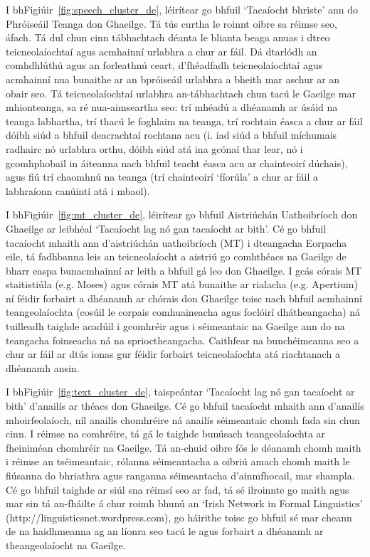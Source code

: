 \begin{multicols}{2}
%
I bhFigiúir~\ref{fig:speech_cluster_de}, léirítear go bhfuil `Tacaíocht bhriste’ ann do Phróiseáil Teanga don Ghaeilge. Tá tús curtha le roinnt oibre sa réimse seo, áfach. Tá dul chun cinn tábhachtach déanta le blianta beaga anuas i dtreo teicneolaíochtaí agus acmhainní urlabhra a chur ar fáil. Dá dtarlódh an comhdhlúthú agus an forleathnú ceart, d’fhéadfadh teicneolaíochtaí agus acmhainní nua bunaithe ar an bpróiseáil urlabhra a bheith mar aschur ar an obair seo. Tá teicneolaíochtaí urlabhra an-tábhachtach chun tacú le Gaeilge mar mhionteanga, sa ré nua-aimseartha seo: trí mhéadú a dhéanamh ar úsáid na teanga labhartha, trí thacú le foghlaim na teanga, trí rochtain éasca a chur ar fáil dóibh siúd a bhfuil deacrachtaí rochtana acu (i. iad siúd a bhfuil míchumais radhairc nó urlabhra orthu, dóibh siúd atá ina gcónaí thar lear, nó i gcomhphobail in áiteanna nach bhfuil teacht éasca acu ar chainteoirí dúchais), agus fiú trí chaomhnú na teanga (trí chainteoirí `fíorúla’ a chur ar fáil a labhraíonn canúintí atá i mbaol).

I bhFigiúir~\ref{fig:mt_cluster_de}, léirítear go bhfuil Aistriúchán Uathoibríoch don Ghaeilge ar leibhéal ‘Tacaíocht lag nó gan tacaíocht ar bith’. Cé go bhfuil tacaíocht mhaith ann d’aistriúchán uathoibríoch (MT) i dteangacha Eorpacha eile, tá fadhbanna leis an teicneolaíocht a aistriú go comhthéacs na Gaeilge de bharr easpa bunacmhainní ar leith a bhfuil gá leo don Ghaeilge. I gcás córais MT staitistiúla (e.g. Moses) agus córais MT atá bunaithe ar rialacha (e.g. Apertium) ní féidir forbairt a dhéanamh ar chórais don Ghaeilge toisc nach bhfuil acmhainní teangeolaíochta (cosúil le corpais comhuaineacha agus foclóirí dhátheangacha) ná tuilleadh taighde acadúil i gcomhréir agus i séimeantaic na Gaeilge ann do na teangacha foinseacha ná na sprioctheangacha. Caithfear na bunchéimeanna seo a chur ar fáil ar dtús ionas gur féidir forbairt teicneolaíochta atá riachtanach a dhéanamh ansin.

I bhFigiúir~\ref{fig:text_cluster_de}, taispeántar ‘Tacaíocht lag nó gan tacaíocht ar bith’ d’anailís ar théacs don Ghaeilge. Cé go bhfuil tacaíocht mhaith ann d’anailís mhoirfeolaíoch, níl anailís chomhréire ná anailís séimeantaic chomh fada sin chun cinn. I réimse na comhréire, tá gá le taighde bunúsach teangeolaíochta ar fheiniméan chomhréir na Gaeilge. Tá an-chuid oibre fós le déanamh chomh maith i réimse an tséimeantaic, rólanna séimeantacha a oibriú amach chomh maith le fiúsanna do bhriathra agus ranganna séimeantacha d’ainmfhocail, mar shampla. Cé go bhfuil taighde ar siúl sna réimsí seo ar fad, tá sé ilroinnte go maith agus mar sin tá an-fháilte á chur roimh bhunú an ‘Irish Network in Formal Linguistics' (http://linguisticsnet.wordpress.com), go háirithe toisc go bhfuil sé mar cheann de na haidhmeanna ag an líonra seo tacú le agus forbairt a dhéanamh ar theangeolaíocht na Gaeilge.


\end{multicols}

